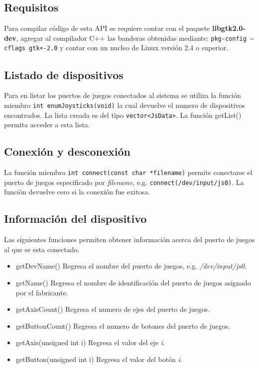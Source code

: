 \documentclass[a4paper,10pt]{article}
\begin{document}
  \subsection{Requisitos}
    Para compilar código de esta API se requiere contar con el paquete \textbf{libgtk2.0-dev}, agregar al compilador C++ las banderas obtenidas mediante: \texttt{pkg-config --cflags gtk+-2.0}  y contar con un nucleo de Linux versión 2.4 o superior.

  \subsection{Listado de dispositivos}
    Para en listar los puertos de juegos conectados al sistema se utiliza la función miembro \texttt{int enumJoysticks(void)} la cual devuelve el numero de dispositivos encontrados. La lista creada es del tipo \texttt{vector<JsData>}. La función getList() permita acceder a esta lista.
	
  \subsection{Conexión y desconexión}
    La función miembro \texttt{int connect(const char *filename)} permite conectarse el puerto de juegos especificado por \textit{filename}, e.g. \texttt{connect(/dev/input/js0)}. La función devuelve cero si la conexión fue exitosa.


\subsection{Información del dispositivo}
Las siguientes funciones permiten obtener información acerca del puerto de juegos al que se esta conectado.
  \begin{itemize}
    \item getDevName() Regresa el nombre del puerto de juegos, e.g. \textit{/dev/input/js0}.
    \item getName() Regresa el nombre de identificación del puerto de juegos asignado por el fabricante.
    \item getAxisCount() Regresa el numero de ejes del puerto de juegos.
    \item getButtonCount() Regresa el numero de botones del puerto de juegos.
    \item getAxis(unsigned int i) Regresa el valor del eje \textit{i}.
    \item getButton(unsigned int i) Regresa el valor del botón \textit{i}.
  \end{itemize}
\end{document}
